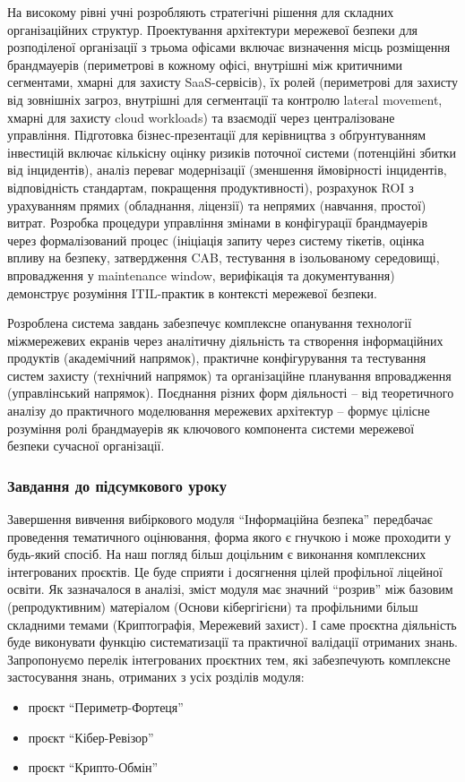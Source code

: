 На високому рівні учні розробляють стратегічні рішення для складних організаційних структур. Проектування архітектури мережевої безпеки для розподіленої організації з трьома офісами включає визначення місць розміщення брандмауерів (периметрові в кожному офісі, внутрішні між критичними сегментами, хмарні для захисту SaaS-сервісів), їх ролей (периметрові для захисту від зовнішніх загроз, внутрішні для сегментації та контролю lateral movement, хмарні для захисту cloud workloads) та взаємодії через централізоване управління. Підготовка бізнес-презентації для керівництва з обґрунтуванням інвестицій включає кількісну оцінку ризиків поточної системи (потенційні збитки від інцидентів), аналіз переваг модернізації (зменшення ймовірності інцидентів, відповідність стандартам, покращення продуктивності), розрахунок ROI з урахуванням прямих (обладнання, ліцензії) та непрямих (навчання, простої) витрат. Розробка процедури управління змінами в конфігурації брандмауерів через формалізований процес (ініціація запиту через систему тікетів, оцінка впливу на безпеку, затвердження CAB, тестування в ізольованому середовищі, впровадження у maintenance window, верифікація та документування) демонструє розуміння ITIL-практик в контексті мережевої безпеки.

Розроблена система завдань забезпечує комплексне опанування технології міжмережевих екранів через аналітичну діяльність та створення інформаційних продуктів (академічний напрямок), практичне конфігурування та тестування систем захисту (технічний напрямок) та організаційне планування впровадження (управлінський напрямок). Поєднання різних форм діяльності – від теоретичного аналізу до практичного моделювання мережевих архітектур – формує цілісне розуміння ролі брандмауерів як ключового компонента системи мережевої безпеки сучасної організації.



\subsubsection{Завдання до підсумкового уроку}

Завершення вивчення вибіркового модуля ``Інформаційна безпека'' передбачає проведення тематичного оцінювання, форма якого є гнучкою і може проходити у будь-який спосіб. На наш погляд більш доцільним є виконання комплексних інтегрованих проєктів. Це буде сприяти і досягнення цілей профільної ліцейної освіти. Як зазначалося в аналізі, зміст модуля має значний ``розрив'' між базовим (репродуктивним) матеріалом (Основи кібергігієни) та профільними більш складними темами (Криптографія, Мережевий захист). І саме проєктна діяльність буде виконувати функцію систематизації та практичної валідації отриманих знань. Запропонуємо перелік інтегрованих проєктних тем, які забезпечують комплексне застосування знань, отриманих з усіх розділів модуля:
\begin{itemize}
    \item проєкт ``Периметр-Фортеця''
    \item проєкт ``Кібер-Ревізор''
    \item проєкт ``Крипто-Обмін''
\end{itemize}

